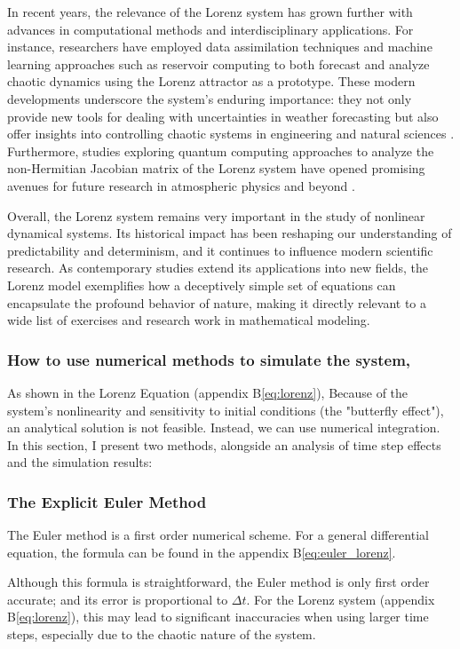 In recent years, the relevance of the Lorenz system has grown further with advances in computational methods and interdisciplinary applications. For instance, researchers have employed data assimilation techniques and machine learning approaches such as reservoir computing to both forecast and analyze chaotic dynamics using the Lorenz attractor as a prototype. These modern developments underscore the system’s enduring importance: they not only provide new tools for dealing with uncertainties in weather forecasting but also offer insights into controlling chaotic systems in engineering and natural sciences \cite{Pathak_2017}. Furthermore, studies exploring quantum computing approaches to analyze the non-Hermitian Jacobian matrix of the Lorenz system have opened promising avenues for future research in atmospheric physics and beyond \cite{armaos2024quantumcomputingatmosphericdynamics}.

Overall, the Lorenz system remains very important in the study of nonlinear dynamical systems. Its historical impact has been reshaping our understanding of predictability and determinism, and it continues to influence modern scientific research. As contemporary studies extend its applications into new fields, the Lorenz model exemplifies how a deceptively simple set of equations can encapsulate the profound behavior of nature, making it directly relevant to a wide list of exercises and research work in mathematical modeling.

\subsubsection{How to use numerical methods to simulate the system, }
As shown in the Lorenz Equation (appendix B\ref{eq:lorenz}), Because of the system's nonlinearity and sensitivity to initial conditions (the "butterfly effect"), an analytical solution is not feasible. Instead, we can use numerical integration. In this section, I present two methods, alongside an analysis of time step effects and the simulation results:


\subsubsection{The Explicit Euler Method}

The Euler method is a first order numerical scheme. For a general differential equation, the formula can be found in the appendix B\ref{eq:euler_lorenz}.

Although this formula is straightforward, the Euler method is only first order accurate; and its error is proportional to $\Delta t$. For the Lorenz system (appendix B\ref{eq:lorenz}), this may lead to significant inaccuracies when using larger time steps, especially due to the chaotic nature of the system.

